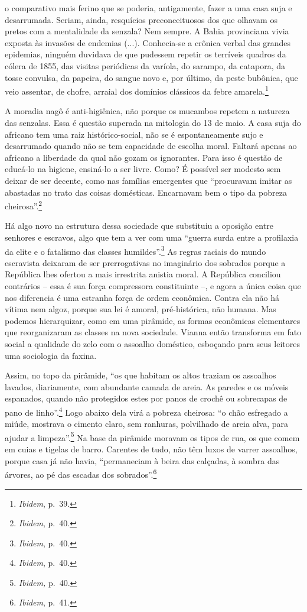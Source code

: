 o comparativo mais ferino que se poderia, antigamente, fazer a uma casa
suja e desarrumada. Seriam, ainda, resquícios preconceituosos dos que
olhavam os pretos com a mentalidade da senzala? Nem sempre. A Bahia
provinciana vivia exposta às invasões de endemias (...). Conhecia-se a
crônica verbal das grandes epidemias, ninguém duvidava de que pudessem
repetir os terríveis quadros da cólera de 1855, das visitas periódicas
da varíola, do sarampo, da catapora, da tosse convulsa, da papeira, do
sangue novo e, por último, da peste bubônica, que veio assentar, de
chofre, arraial dos domínios clássicos da febre amarela.\footnote{\emph{Ibidem},
  p.~39.}

A moradia nagô é anti-higiênica, não porque os mucambos repetem a
natureza das senzalas. Essa é questão superada na mitologia do 13 de
maio. A casa suja do africano tem uma raiz histórico-social, não se é
espontaneamente sujo e desarrumado quando não se tem capacidade de
escolha moral. Faltará apenas ao africano a liberdade da qual não gozam
os ignorantes. Para isso é questão de educá-lo na higiene, ensiná-lo a
ser livre. Como? É possível ser modesto sem deixar de ser decente, como
nas famílias emergentes que ``procuravam imitar as abastadas no trato
das coisas domésticas. Encarnavam bem o tipo da pobreza
cheirosa''.\footnote{\emph{Ibidem}, p.~40.}

Há algo novo na estrutura dessa sociedade que substituiu a oposição
entre senhores e escravos, algo que tem a ver com uma ``guerra surda
entre a profilaxia da elite e o fatalismo das classes
humildes''.\footnote{\emph{Ibidem}, p.~40.} As regras raciais do mundo
escravista deixaram de ser prerrogativas no imaginário dos sobrados
porque a República lhes ofertou a mais irrestrita anistia moral. A
República conciliou contrários -- essa é sua força compressora
constituinte --, e agora a única coisa que nos diferencia é uma estranha
força de ordem econômica. Contra ela não há vítima nem algoz, porque sua
lei é amoral, pré-histórica, não humana. Mas podemos hierarquizar, como
em uma pirâmide, as formas econômicas elementares que reorganizaram as
classes na nova sociedade. Vianna então transforma em fato social a
qualidade do zelo com o assoalho doméstico, esboçando para seus leitores
uma sociologia da faxina.

Assim, no topo da pirâmide, ``os que habitam os altos traziam os
assoalhos lavados, diariamente, com abundante camada de areia. As
paredes e os móveis espanados, quando não protegidos estes por panos de
crochê ou sobrecapas de pano de linho''.\footnote{\emph{Ibidem}, p.~40.}
Logo abaixo dela virá a pobreza cheirosa: ``o chão esfregado a miúde,
mostrava o cimento claro, sem ranhuras, polvilhado de areia alva, para
ajudar a limpeza''.\footnote{\emph{Ibidem,} p.~40.} Na base da pirâmide
moravam os tipos de rua, os que comem em cuias e tigelas de barro.
Carentes de tudo, não têm luxos de varrer assoalhos, porque casa já não
havia, ``permaneciam à beira das calçadas, à sombra das árvores, ao pé
das escadas dos sobrados''.\footnote{\emph{Ibidem}, p.~41.}

